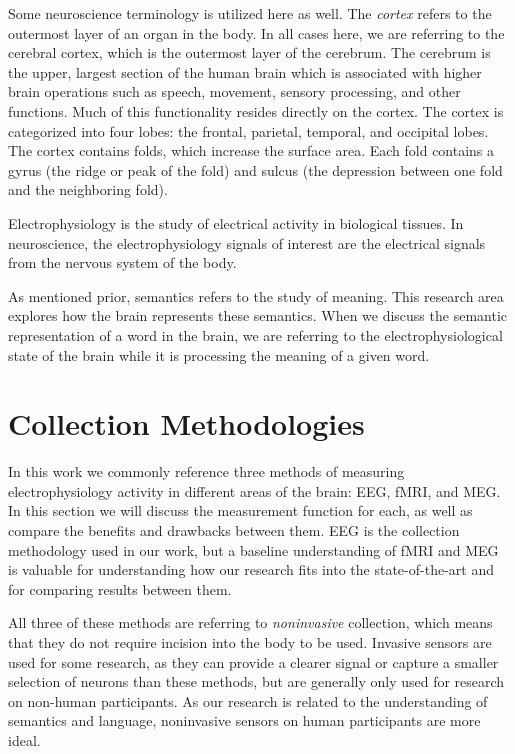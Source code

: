 Some neuroscience terminology is utilized here as well. The \emph{cortex} 
refers to the outermost layer of an organ in the body. In all cases here, we 
are referring to the cerebral cortex, which is the outermost layer of the 
cerebrum. The cerebrum is the upper, largest section of the human brain which 
is associated with higher brain operations such as speech, movement, sensory 
processing, and other functions. Much of this functionality resides directly on 
the cortex. The cortex is categorized into four lobes: the frontal, parietal, 
temporal, and occipital lobes. The cortex contains folds, which increase the 
surface area. Each fold contains a gyrus (the ridge or peak of the fold) and 
sulcus (the depression between one fold and the neighboring fold).

Electrophysiology is the study of electrical activity in biological tissues. In 
neuroscience, the electrophysiology signals of interest are the electrical 
signals from the nervous system of the body.

As mentioned prior, semantics refers to the study of meaning. This research 
area explores how the brain represents these semantics. When we discuss the 
semantic representation of a word in the brain, we are referring to the 
electrophysiological state of the brain while it is processing the meaning of a 
given word.

\section{Collection Methodologies}

In this work we commonly reference three methods of measuring electrophysiology 
activity in different areas of the brain: EEG, fMRI, and MEG. In this section 
we will discuss the measurement function for each, as well as compare the 
benefits and drawbacks between them. EEG is the collection methodology used in 
our work, but a baseline understanding of fMRI and MEG is valuable for 
understanding how our research fits into the state-of-the-art and for comparing 
results between them. 

All three of these methods are referring to \emph{noninvasive} collection, 
which means that they do not require incision into the body to be used.  
Invasive sensors are used for some research, as they can provide a clearer 
signal or capture a smaller selection of neurons than these methods, but are 
generally only used for research on non-human participants. As our research is 
related to the understanding of semantics and language, noninvasive sensors on 
human participants are more ideal.

